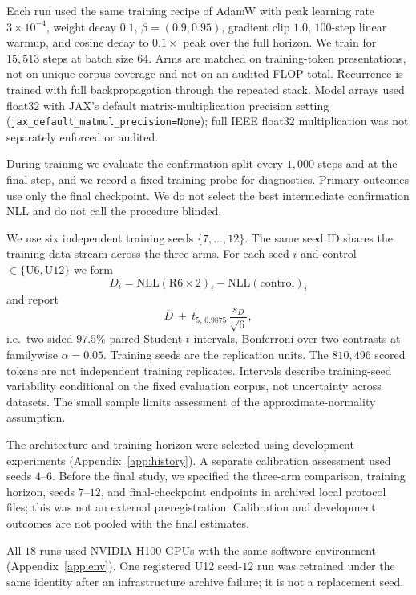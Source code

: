 \documentclass{article}
\begin{document}
Each run used the same training recipe of AdamW with peak learning rate $3\times 10^{-4}$, weight decay $0.1$, $\beta = (0.9, 0.95)$, gradient clip $1.0$, $100$-step linear warmup, and cosine decay to $0.1\times$ peak over the full horizon. We train for $15{,}513$ steps at batch size $64$. Arms are matched on training-token presentations, not on unique corpus coverage and not on an audited FLOP total. Recurrence is trained with full backpropagation through the repeated stack. Model arrays used float32 with JAX's default matrix-multiplication precision setting (\texttt{jax\_default\_matmul\_precision=None}); full IEEE float32 multiplication was not separately enforced or audited.

During training we evaluate the confirmation split every $1{,}000$ steps and at the final step, and we record a fixed training probe for diagnostics. Primary outcomes use only the final checkpoint. We do not select the best intermediate confirmation NLL and do not call the procedure blinded.

We use six independent training seeds \(\{7,\ldots,12\}\). The same seed ID shares the training data stream across the three arms. For each seed \(i\) and control \(\in\{\mathrm{U6},\mathrm{U12}\}\) we form
\[
D_i=\mathrm{NLL}(\mathrm{R6}\times 2)_i-\mathrm{NLL}(\mathrm{control})_i
\]
and report
\[
\overline{D}\ \pm\ t_{5,\,0.9875}\,\frac{s_D}{\sqrt{6}},
\]
i.e.\ two-sided $97.5\%$ paired Student-$t$ intervals, Bonferroni over two contrasts at familywise $\alpha=0.05$. Training seeds are the replication units. The $810{,}496$ scored tokens are not independent training replicates. Intervals describe training-seed variability conditional on the fixed evaluation corpus, not uncertainty across datasets. The small sample limits assessment of the approximate-normality assumption.

The architecture and training horizon were selected using development experiments (Appendix~\ref{app:history}). A separate calibration assessment used seeds $4$--$6$. Before the final study, we specified the three-arm comparison, training horizon, seeds $7$--$12$, and final-checkpoint endpoints in archived local protocol files; this was not an external preregistration. Calibration and development outcomes are not pooled with the final estimates.

All $18$ runs used NVIDIA H100 GPUs with the same software environment (Appendix~\ref{app:env}). One registered U12 seed-$12$ run was retrained under the same identity after an infrastructure archive failure; it is not a replacement seed.
\end{document}
